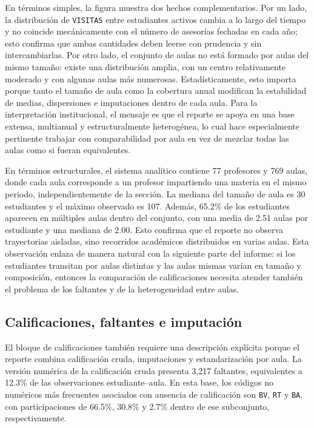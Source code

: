 \documentclass[10pt,letterpaper]{article} %
\numberwithin{figure}{subsection}
\begin{document}
En términos simples, la figura muestra dos hechos complementarios. Por un lado, la distribución de \texttt{VISITAS} entre estudiantes activos cambia a lo largo del tiempo y no coincide mecánicamente con el número de asesorías fechadas en cada año; esto confirma que ambas cantidades deben leerse con prudencia y sin intercambiarlas. Por otro lado, el conjunto de aulas no está formado por aulas del mismo tamaño: existe una distribución amplia, con un centro relativamente moderado y con algunas aulas más numerosas. Estadísticamente, esto importa porque tanto el tamaño de aula como la cobertura anual modifican la estabilidad de medias, dispersiones e imputaciones dentro de cada aula. Para la interpretación institucional, el mensaje es que el reporte se apoya en una base extensa, multianual y estructuralmente heterogénea, lo cual hace especialmente pertinente trabajar con comparabilidad por aula en vez de mezclar todas las aulas como si fueran equivalentes.

En términos estructurales, el sistema analítico contiene 77 profesores y 769 aulas, donde cada aula corresponde a un profesor impartiendo una materia en el mismo periodo, independientemente de la sección. La mediana del tamaño de aula es 30 estudiantes y el máximo observado es 107. Además, 65.2\% de los estudiantes aparecen en múltiples aulas dentro del conjunto, con una media de 2.51 aulas por estudiante y una mediana de 2.00. Esto confirma que el reporte no observa trayectorias aisladas, sino recorridos académicos distribuidos en varias aulas. Esta observación enlaza de manera natural con la siguiente parte del informe: si los estudiantes transitan por aulas distintas y las aulas mismas varían en tamaño y composición, entonces la comparación de calificaciones necesita atender también el problema de los faltantes y de la heterogeneidad entre aulas.

\subsection{Calificaciones, faltantes e imputación}
El bloque de calificaciones también requiere una descripción explícita porque el reporte combina calificación cruda, imputaciones y estandarización por aula. La versión numérica de la calificación cruda presenta 3{,}217 faltantes, equivalentes a 12.3\% de las observaciones estudiante--aula. En esta base, los códigos no numéricos más frecuentes asociados con ausencia de calificación son \texttt{BV}, \texttt{RT} y \texttt{BA}, con participaciones de 66.5\%, 30.8\% y 2.7\% dentro de ese subconjunto, respectivamente.
\end{document}
